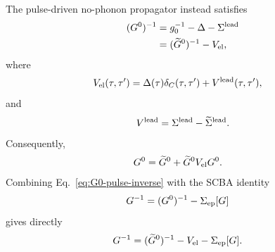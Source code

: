 \documentclass[
 reprint,
 superscriptaddress,
 amsmath,amssymb,
 aps,prb,
 longbibliography,
 floatfix
]{revtex4-2}
\begin{document}
The pulse-driven no-phonon propagator instead satisfies
\begin{equation}
\begin{aligned}
(G^0)^{-1}
&=
g_0^{-1}
-
\Delta
-
\Sigma^{\rm lead}
\\
&=
(\widetilde G^0)^{-1}
-
V_{\rm el},
\end{aligned}
\label{eq:G0-pulse-inverse}
\end{equation}
where
\begin{equation*}
\begin{aligned}
V_{\rm el}(\tau,\tau')
={}&
\Delta(\tau)
\delta_C(\tau,\tau') + V^{\rm lead}(\tau,\tau'),
\end{aligned}
\end{equation*}
and
\begin{equation*}
V^{\rm lead}
=
\Sigma^{\rm lead}
-
\widetilde\Sigma^{\rm lead}.
\end{equation*}
Consequently,
\begin{equation}
\begin{aligned}
G^0
={}&
\widetilde G^0 + \widetilde G^0
V_{\rm el}
G^0.
\end{aligned}
\label{eq:electronic-pf-dyson}
\end{equation}
Combining Eq.~\eqref{eq:G0-pulse-inverse} with the SCBA identity
\begin{equation*}
\begin{aligned}
G^{-1}
={}&
(G^0)^{-1}
-
\Sigma_{\rm ep}[G]
\end{aligned}
\end{equation*}
gives directly
\begin{equation}
\begin{aligned}
G^{-1}
={}&
(\widetilde G^0)^{-1}
-
V_{\rm el}
-
\Sigma_{\rm ep}[G].
\end{aligned}
\label{eq:full-inverse-pf}
\end{equation}
\end{document}
